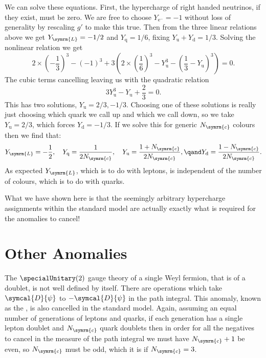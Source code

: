 \documentclass[fleqn]{NotesClass}
\newcommand{\Pparticle}[1]{\mathrm{#1}}
\newcommand{\Pu}{\ensuremath{\Pparticle{u}}}
\newcommand{\Pd}{\ensuremath{\Pparticle{d}}}
\newcommand{\Pe}{\ensuremath{\Pparticle{e}^{-}}}
\newcommand{\Pq}{\ensuremath{\Pparticle{q}}}
\newcommand{\DL}[1]{\symcal{D}{#1}}
\newcommand{\numberColors}{N_{\symrm{c}}}
\newcommand{\Left}{\symrm{L}}
\begin{document}
    We can solve these equations.
    First, the hypercharge of right handed neutrinos, if they exist, must be zero.
    We are free to choose \(Y_{\Pe} = -1\) without loss of generality by rescaling \(g'\) to make this true.
    Then from the three linear relations above we get \(Y_{\Left} = -1/2\) and \(Y_{\Pq} = 1/6\), fixing \(Y_{\Pu} + Y_{\Pd} = 1/3\).
    Solving the nonlinear relation we get
    \begin{equation}
        2 \times \left( -\frac{1}{3} \right)^3 - (-1)^3 + 3\left( 2 \times \left( \frac{1}{6} \right)^3 - Y_{\Pu}^3 - \left( \frac{1}{3} - Y_{\Pu} \right)^3 \right) = 0.
    \end{equation}
    The cubic terms cancelling leaving us with the quadratic relation
    \begin{equation}
        3Y_{\Pu}^3 - Y_{\Pu} + \frac{2}{3} = 0.
    \end{equation}
    This has two solutions, \(Y_{\Pu} = 2/3, -1/3\).
    Choosing one of these solutions is really just choosing which quark we call up and which we call down, so we take \(Y_{\Pu} = 2/3\), which forces \(Y_{\Pd} = -1/3\).
    If we solve this for generic \(\numberColors\) colours then we find that:
    \begin{equation}
        Y_{\Left} = -\frac{1}{2}, \quad Y_{\Pq} = \frac{1}{2\numberColors}, \quad Y_{\Pu} = \frac{1 + \numberColors}{2\numberColors}, \qand Y_{\Pd} = \frac{1 - \numberColors}{2\numberColors}.
    \end{equation}
    As expected \(Y_{\Left}\), which is to do with leptons, is independent of the number of colours, which is to do with quarks.
    
    What we have shown here is that the seemingly arbitrary hypercharge assignments within the standard model are actually exactly what is required for the anomalies to cancel!
    
    \section{Other Anomalies}
    The \(\specialUnitary(2)\) gauge theory of a single Weyl fermion, that is of a doublet, is not well defined by itself.
    There are operations which take \(\DL{\psi}\) to \(-\DL{\psi}\) in the path integral.
    This anomaly, known as the , is also cancelled in the standard model.
    Again, assuming an equal number of generations of leptons and quarks, if each generation has a single lepton doublet and \(\numberColors\) quark doublets then in order for all the negatives to cancel in the measure of the path integral we must have \(\numberColors + 1\) be even, so \(\numberColors\) must be odd, which it is if \(\numberColors = 3\).
    
\end{document}
